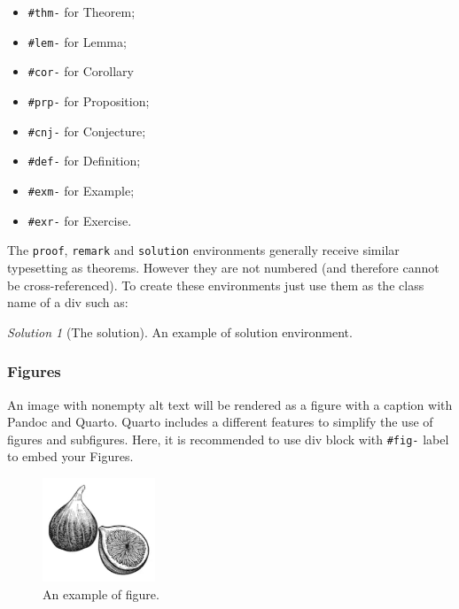 \documentclass[
  journal,
]{IEEEtran}%
\providecommand{\tightlist}{%
  \setlength{\itemsep}{0pt}\setlength{\parskip}{0pt}}\usepackage{longtable,booktabs,array}
\theoremstyle{plain}
\theoremstyle{remark}
\newtheorem*{solution}{Solution}
\begin{document}
\begin{itemize}
\tightlist
\item
  \texttt{\#thm-} for Theorem;
\item
  \texttt{\#lem-} for Lemma;
\item
  \texttt{\#cor-} for Corollary
\item
  \texttt{\#prp-} for Proposition;
\item
  \texttt{\#cnj-} for Conjecture;
\item
  \texttt{\#def-} for Definition;
\item
  \texttt{\#exm-} for Example;
\item
  \texttt{\#exr-} for Exercise.
\end{itemize}

The \texttt{proof}, \texttt{remark} and \texttt{solution} environments
generally receive similar typesetting as theorems. However they are not
numbered (and therefore cannot be cross-referenced). To create these
environments just use them as the class name of a div such as:

\begin{solution}[The solution]

An example of solution environment.

\end{solution}

\hypertarget{figures}{%
\subsubsection{Figures}\label{figures}}

An image with nonempty alt text will be rendered as a figure with a
caption with Pandoc and Quarto. Quarto includes a different features to
simplify the use of figures and subfigures. Here, it is recommended to
use div block with \texttt{\#fig-} label to embed your Figures.

\begin{figure}

{\centering 

\includegraphics[width=0.3\textwidth,height=\textheight]{fig1.png}

}

\caption{\label{fig-1}An example of figure.}

\end{figure}
\end{document}
